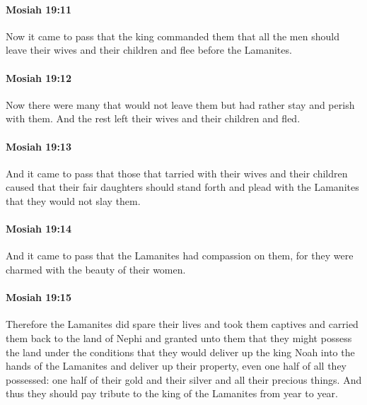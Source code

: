		\paragraph{Mosiah 19:11} %
			\label{MOSIAH-19-11}

			Now it came to pass that the king commanded them
			that all the men should leave their wives and their children
			and flee before the Lamanites.

		\paragraph{Mosiah 19:12} %
			\label{MOSIAH-19-12}

			Now there were many that would not leave them
			but had rather stay and perish with them.
			And the rest left their wives and their children and fled.

		\paragraph{Mosiah 19:13} %
			\label{MOSIAH-19-13}

			And it came to pass that
			those that tarried with their wives and their children caused
			that their fair daughters should stand forth and plead with the Lamanites
			that they would not slay them.

		\paragraph{Mosiah 19:14} %
			\label{MOSIAH-19-14}

			And it came to pass that the Lamanites had compassion on them,
			for they were charmed with the beauty of their women.

		\paragraph{Mosiah 19:15} %
			\label{MOSIAH-19-15}

			Therefore the Lamanites did spare their lives and took them captives
			and carried them back to the land of Nephi and granted unto them
			that they might possess the land under the conditions
			that they would deliver up the king Noah into the hands of the Lamanites
			and deliver up their property,
			even one half of all they possessed:
			one half of their gold and their silver and all their precious things.
			And thus they should pay tribute to the king of the Lamanites from year to year.

